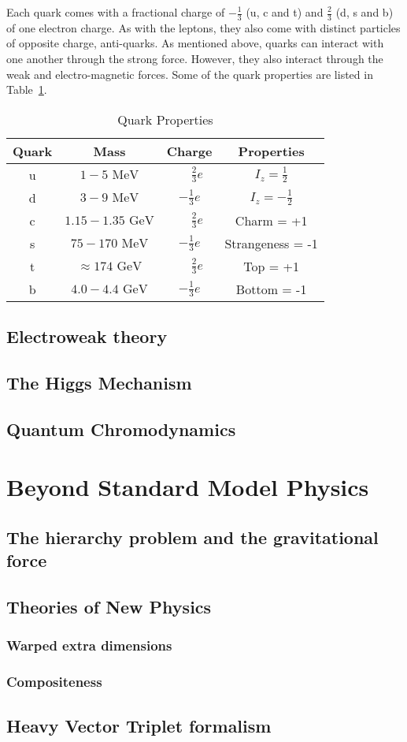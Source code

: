 Each quark comes with a fractional charge of $-\frac{1}{3}$ (u, c and t) and $\frac{2}{3}$ (d, s and b) of one electron charge. As with the leptons, they also come with distinct particles of opposite charge, anti-quarks. As mentioned above, quarks can interact with one another through the strong force. However, they also interact through the weak and electro-magnetic forces.
Some of the quark properties are listed in Table~\ref{table:theory:quarkprop}.
\begin{table}
\begin{center}
\begin{tabular}{|c|c|c|c|}
\hline
Quark & Mass & Charge & Properties \\
\hline
u & $1-5 \mbox{ MeV}$         & $\phantom{-}\frac{2}{3} e$  & $I_{z} = \frac{1}{2}$ \\
d & $3-9 \mbox{ MeV}$         & $-\frac{1}{3} e$ & $I_{z} = -\frac{1}{2}$ \\
c & $1.15-1.35 \mbox{ GeV}$   & $\phantom{-}\frac{2}{3} e$  & Charm = +1 \\
s & $75-170 \mbox{ MeV}$      & $-\frac{1}{3} e$ & Strangeness = -1 \\
t & $\approx 174 \mbox{ GeV}$ & $\phantom{-}\frac{2}{3} e$  & Top = +1 \\
b & $4.0-4.4 \mbox{ GeV}$     & $-\frac{1}{3} e$ & Bottom = -1 \\
\hline
\end{tabular}
\end{center}
\caption{Quark Properties}
\label{table:theory:quarkprop}

\end{table}


\subsection{Electroweak theory}
\label{sec:theory:ew}
\subsection{The Higgs Mechanism}
\subsection{Quantum Chromodynamics}
\label{sec:theory:qcd}
\section{Beyond Standard Model Physics}
\subsection{The hierarchy problem and the gravitational force}
\subsection{Theories of New Physics}
\subsubsection{Warped extra dimensions}
\label{sec:theory:wed}
\subsubsection{Compositeness}
\subsection{Heavy Vector Triplet formalism}
\label{sec:theory:hvt}
	